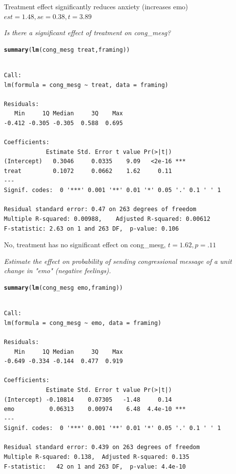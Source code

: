\documentclass{article}\usepackage{graphicx, color}
\makeatletter
\newcommand{\hlfunctioncall}[1]{\textcolor[rgb]{0.501960784313725,0,0.329411764705882}{\textbf{#1}}}%
\newenvironment{kframe}{%
 \def\at@end@of@kframe{}%
 \ifinner\ifhmode%
  \def\at@end@of@kframe{\end{minipage}}%
  \begin{minipage}{\columnwidth}%
 \fi\fi%
 \def\FrameCommand##1{\hskip\@totalleftmargin \hskip-\fboxsep
 \colorbox{shadecolor}{##1}\hskip-\fboxsep
     \hskip-\linewidth \hskip-\@totalleftmargin \hskip\columnwidth}%
 \MakeFramed {\advance\hsize-\width
   \@totalleftmargin\z@ \linewidth\hsize
   \@setminipage}}%
 {\par\unskip\endMakeFramed%
 \at@end@of@kframe}
\newenvironment{knitrout}{}{} %
\makeatother
\begin{document}
Treatment effect significantly reduces anxiety (increases emo) $est=1.48, se=0.38, t=3.89$

\emph{Is there a significant effect of treatment on cong\_mesg?}
\begin{knitrout}
\color{fgcolor}\begin{kframe}
\begin{alltt}
\hlfunctioncall{summary}(\hlfunctioncall{lm}(cong_mesg ~ treat,framing)) 
\end{alltt}
\begin{verbatim}

Call:
lm(formula = cong_mesg ~ treat, data = framing)

Residuals:
   Min     1Q Median     3Q    Max 
-0.412 -0.305 -0.305  0.588  0.695 

Coefficients:
            Estimate Std. Error t value Pr(>|t|)    
(Intercept)   0.3046     0.0335    9.09   <2e-16 ***
treat         0.1072     0.0662    1.62     0.11    
---
Signif. codes:  0 '***' 0.001 '**' 0.01 '*' 0.05 '.' 0.1 ' ' 1 

Residual standard error: 0.47 on 263 degrees of freedom
Multiple R-squared: 0.00988,	Adjusted R-squared: 0.00612 
F-statistic: 2.63 on 1 and 263 DF,  p-value: 0.106 
\end{verbatim}
\end{kframe}
\end{knitrout}

No, treatment has no significant effect on cong\_mesg, $t=1.62, p=.11$

\emph{Estimate the effect on probability of sending congressional message of a unit change in "emo" (negative feelings).}
\begin{knitrout}
\color{fgcolor}\begin{kframe}
\begin{alltt}
\hlfunctioncall{summary}(\hlfunctioncall{lm}(cong_mesg ~ emo,framing)) 
\end{alltt}
\begin{verbatim}

Call:
lm(formula = cong_mesg ~ emo, data = framing)

Residuals:
   Min     1Q Median     3Q    Max 
-0.649 -0.334 -0.144  0.477  0.919 

Coefficients:
            Estimate Std. Error t value Pr(>|t|)    
(Intercept) -0.10814    0.07305   -1.48     0.14    
emo          0.06313    0.00974    6.48  4.4e-10 ***
---
Signif. codes:  0 '***' 0.001 '**' 0.01 '*' 0.05 '.' 0.1 ' ' 1 

Residual standard error: 0.439 on 263 degrees of freedom
Multiple R-squared: 0.138,	Adjusted R-squared: 0.135 
F-statistic:   42 on 1 and 263 DF,  p-value: 4.4e-10 
\end{verbatim}
\end{kframe}
\end{knitrout}
\end{document}
